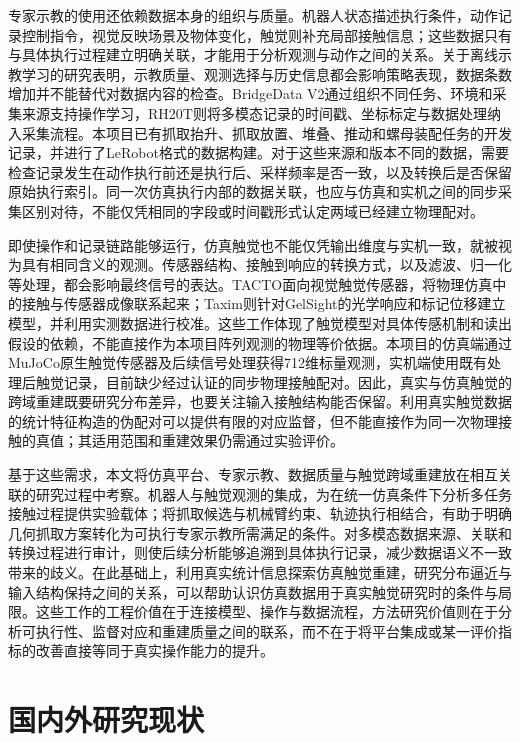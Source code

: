 专家示教的使用还依赖数据本身的组织与质量。机器人状态描述执行条件，动作记录控制指令，视觉反映场景及物体变化，触觉则补充局部接触信息；这些数据只有与具体执行过程建立明确关联，才能用于分析观测与动作之间的关系。关于离线示教学习的研究表明，示教质量、观测选择与历史信息都会影响策略表现，数据条数增加并不能替代对数据内容的检查\cite{mandlekar2022demonstrations}。BridgeData V2通过组织不同任务、环境和采集来源支持操作学习，RH20T则将多模态记录的时间戳、坐标标定与数据处理纳入采集流程\cite{walke2023bridgedata,fang2024rh20t}。本项目已有抓取抬升、抓取放置、堆叠、推动和螺母装配任务的开发记录，并进行了LeRobot格式的数据构建。对于这些来源和版本不同的数据，需要检查记录发生在动作执行前还是执行后、采样频率是否一致，以及转换后是否保留原始执行索引。同一次仿真执行内部的数据关联，也应与仿真和实机之间的同步采集区别对待，不能仅凭相同的字段或时间戳形式认定两域已经建立物理配对。

即使操作和记录链路能够运行，仿真触觉也不能仅凭输出维度与实机一致，就被视为具有相同含义的观测。传感器结构、接触到响应的转换方式，以及滤波、归一化等处理，都会影响最终信号的表达。TACTO面向视觉触觉传感器，将物理仿真中的接触与传感器成像联系起来；Taxim则针对GelSight的光学响应和标记位移建立模型，并利用实测数据进行校准\cite{wang2022tacto,si2022taxim}。这些工作体现了触觉模型对具体传感机制和读出假设的依赖，不能直接作为本项目阵列观测的物理等价依据。本项目的仿真端通过MuJoCo原生触觉传感器及后续信号处理获得712维标量观测，实机端使用既有处理后触觉记录，目前缺少经过认证的同步物理接触配对。因此，真实与仿真触觉的跨域重建既要研究分布差异，也要关注输入接触结构能否保留。利用真实触觉数据的统计特征构造的伪配对可以提供有限的对应监督，但不能直接作为同一次物理接触的真值；其适用范围和重建效果仍需通过实验评价。

基于这些需求，本文将仿真平台、专家示教、数据质量与触觉跨域重建放在相互关联的研究过程中考察。机器人与触觉观测的集成，为在统一仿真条件下分析多任务接触过程提供实验载体；将抓取候选与机械臂约束、轨迹执行相结合，有助于明确几何抓取方案转化为可执行专家示教所需满足的条件。对多模态数据来源、关联和转换过程进行审计，则使后续分析能够追溯到具体执行记录，减少数据语义不一致带来的歧义。在此基础上，利用真实统计信息探索仿真触觉重建，研究分布逼近与输入结构保持之间的关系，可以帮助认识仿真数据用于真实触觉研究时的条件与局限。这些工作的工程价值在于连接模型、操作与数据流程，方法研究价值则在于分析可执行性、监督对应和重建质量之间的联系，而不在于将平台集成或某一评价指标的改善直接等同于真实操作能力的提升。

\section{国内外研究现状}
\label{sec:related_work}

